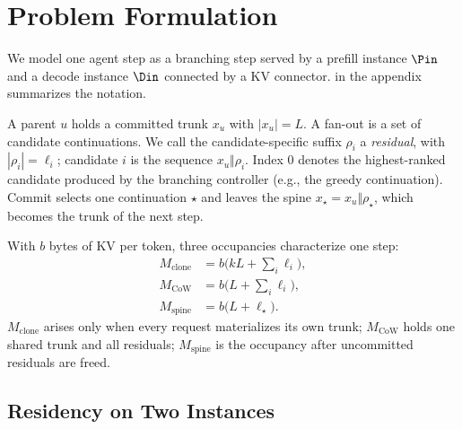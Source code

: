 \section{Problem Formulation}
\label{sec:problem}

We model one agent step as a branching step served by a prefill instance $\Pin$ and a decode instance $\Din$ connected by a KV connector.
 in the appendix summarizes the notation.

\begin{definition}
\label{def:step}
A parent $u$ holds a committed trunk $x_u$ with $|x_u|{=}L$.
A fan-out is a set of candidate continuations.
We call the candidate-specific suffix $\rho_i$ a \emph{residual}, with $|\rho_i|{=}\ell_i$; candidate $i$ is the sequence $x_u\Vert\rho_i$.
Index $0$ denotes the highest-ranked candidate produced by the branching controller (e.g., the greedy continuation).
Commit selects one continuation $\star$ and leaves the spine $x_\star=x_u\Vert\rho_\star$, which becomes the trunk of the next step.
\end{definition}

With $b$ bytes of KV per token, three occupancies characterize one step:
\begin{align}
M_{\mathrm{clone}} &= b\bigl(kL+\textstyle\sum_i\ell_i\bigr), \label{eq:mem}\\
M_{\mathrm{CoW}} &= b\bigl(L+\textstyle\sum_i\ell_i\bigr), \nonumber\\
M_{\mathrm{spine}} &= b\bigl(L+\ell_\star\bigr). \nonumber
\end{align}
$M_{\mathrm{clone}}$ arises only when every request materializes its own trunk; $M_{\mathrm{CoW}}$ holds one shared trunk and all residuals; $M_{\mathrm{spine}}$ is the occupancy after uncommitted residuals are freed.

\subsection{Residency on Two Instances}
\label{sec:residency}

